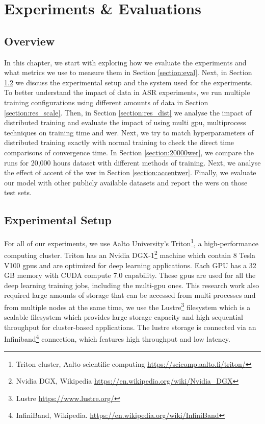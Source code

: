 \chapter{Experiments \& Evaluations}
\label{chapter:evaluation}

\section{Overview}
In this chapter, we start with exploring how we evaluate the experiments and what metrics we use to measure them in Section \ref{section:eval}. Next, in Section \ref{section:trit} we discuss the experimental setup and the system used for the experiments. To better understand the impact of data in ASR experiments, we run multiple training configurations using different amounts of data in Section \ref{section:res_scale}. Then, in Section \ref{section:res_dist} we analyse the impact of distributed training and evaluate the impact of using multi \acrshort{gpu}, multiprocess techniques on training time and \acrshort{wer}. Next, we try to match hyperparameters of distributed training exactly with normal training to check the direct time comparisons of convergence time. In Section \ref{section:20000wer}, we compare the runs for 20,000 hours dataset with different methods of training. Next, we analyse the effect of accent of the \acrshort{wer} in Section \ref{section:accentwer}. Finally, we evaluate our model with other publicly available datasets and report the \acrshort{wer}s on those test sets.


\section{Experimental Setup}
\label{section:trit}
For all of our experiments, we use Aalto University's Triton\footnote{Triton cluster, Aalto scientific computing \href{https://scicomp.aalto.fi/triton/}{https://scicomp.aalto.fi/triton/}}, a high-performance computing cluster. Triton has an Nvidia DGX-1\footnote{Nvidia DGX, Wikipedia \href{https://en.wikipedia.org/wiki/Nvidia_DGX}{https://en.wikipedia.org/wiki/Nvidia\_DGX}} machine which contain 8 Tesla V100 \acrshort{gpu}s and are optimized for deep learning applications. Each GPU has a 32 GB memory with CUDA compute 7.0 capability. These \acrshort{gpu}s are used for all the deep learning training jobs, including the multi-\acrshort{gpu} ones. This research work also required large amounts of storage that can be accessed from multi processes and from multiple nodes at the same time, we use the Lustre\footnote{Lustre \href{https://www.lustre.org/}{https://www.lustre.org/}} filesystem which is a scalable filesystem which provides large storage capacity and high sequential throughput for cluster-based applications. The lustre storage is connected via an Infiniband\footnote{InfiniBand, Wikipedia. \href{https://en.wikipedia.org/wiki/InfiniBand}{https://en.wikipedia.org/wiki/InfiniBand}} connection, which features high throughput and low latency.

